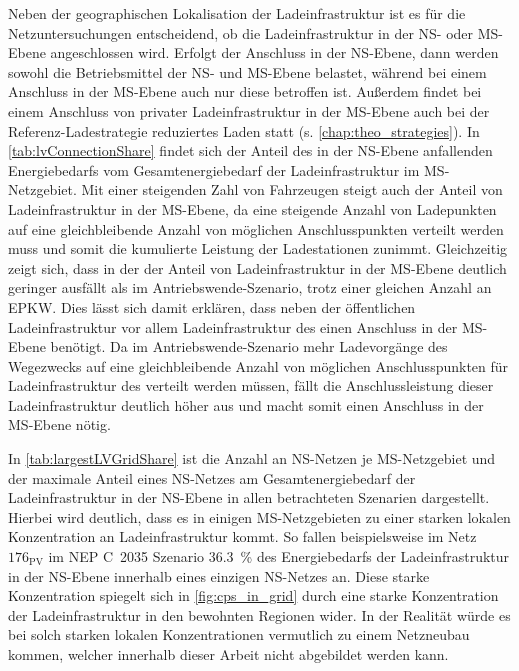 Neben der geographischen Lokalisation der Ladeinfrastruktur ist es für die Netzuntersuchungen entscheidend, ob die Ladeinfrastruktur in der \gls{NS}- oder \gls{MS}-Ebene angeschlossen wird.
Erfolgt der Anschluss in der \gls{NS}-Ebene, dann werden sowohl die Betriebsmittel der \gls{NS}- und \gls{MS}-Ebene belastet, während bei einem Anschluss in der \gls{MS}-Ebene auch nur diese betroffen ist.
Außerdem findet bei einem Anschluss von privater Ladeinfrastruktur in der \gls{MS}-Ebene auch bei der Referenz-Ladestrategie reduziertes Laden statt (s. \autoref{chap:theo_strategies}).
In \autoref{tab:lvConnectionShare} findet sich der Anteil des in der \gls{NS}-Ebene anfallenden Energiebedarfs vom Gesamtenergiebedarf der Ladeinfrastruktur im \gls{MS}-Netzgebiet.
Mit einer steigenden Zahl von Fahrzeugen steigt auch der Anteil von Ladeinfrastruktur in der \gls{MS}-Ebene, da eine steigende Anzahl von Ladepunkten auf eine gleichbleibende Anzahl von möglichen Anschlusspunkten verteilt werden muss und somit die kumulierte Leistung der Ladestationen zunimmt.
Gleichzeitig zeigt sich, dass in der \SzeFirmenparkplatz der Anteil von Ladeinfrastruktur in der \gls{MS}-Ebene deutlich geringer ausfällt als im Antriebswende-Szenario, trotz einer gleichen Anzahl an \gls{EPKW}.
Dies lässt sich damit erklären, dass neben der öffentlichen Ladeinfrastruktur vor allem Ladeinfrastruktur des \UC \Firmeparkplatz einen Anschluss in der \gls{MS}-Ebene benötigt.
Da im Antriebswende-Szenario mehr Ladevorgänge des Wegezwecks \Arbeit auf eine gleichbleibende Anzahl von möglichen Anschlusspunkten für Ladeinfrastruktur des \UC \Firmeparkplatz verteilt werden müssen, fällt die Anschlussleistung dieser Ladeinfrastruktur deutlich höher aus und macht somit einen Anschluss in der \gls{MS}-Ebene nötig.



In \autoref{tab:largestLVGridShare} ist die Anzahl an \gls{NS}-Netzen je \gls{MS}-Netzgebiet und der maximale Anteil eines \gls{NS}-Netzes am Gesamtenergiebedarf der Ladeinfrastruktur in der \gls{NS}-Ebene in allen betrachteten Szenarien dargestellt.
Hierbei wird deutlich, dass es in einigen \gls{MS}-Netzgebieten zu einer starken lokalen Konzentration an Ladeinfrastruktur kommt.
So fallen beispielsweise im Netz \(176_{\text{PV}}\) im NEP C~\num{2035} Szenario \SI{36.3}{\percent} des Energiebedarfs der Ladeinfrastruktur in der \gls{NS}-Ebene innerhalb eines einzigen \gls{NS}-Netzes an.
Diese starke Konzentration spiegelt sich in \autoref{fig:cps_in_grid} durch eine starke Konzentration der Ladeinfrastruktur in den bewohnten Regionen wider.
In der Realität würde es bei solch starken lokalen Konzentrationen vermutlich zu einem Netzneubau kommen, welcher innerhalb dieser Arbeit nicht abgebildet werden kann.

